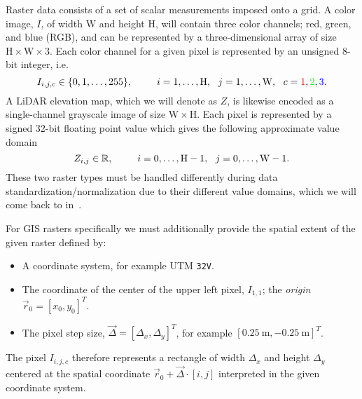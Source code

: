 Raster data consists of a set of scalar measurements imposed onto a grid.
A color image, $I$, of width $\mathrm{W}$ and height $\mathrm{H}$, will contain three color channels; red, green, and blue (RGB), and can be represented by a three-dimensional array of size $\mathrm{H} \times \mathrm{W} \times \mathrm{3}$.
Each color channel for a given pixel is represented by an unsigned 8-bit integer, i.e.
%
\begin{equation*}
  I_{i, j, c} \in \{0, 1, \ldots, 255\},
  \hspace{2.5em}
  i = 1, \ldots, \mathrm{H} ,
  ~~
  j = 1, \ldots, \mathrm{W},
  ~~
  c = \mathrm{\textcolor{red}{1}, \textcolor{green}{2}, \textcolor{blue}{3}}.
\end{equation*}
%
A LiDAR elevation map, which we will denote as $Z$, is likewise encoded as a single-channel grayscale image of size $\mathrm{W} \times \mathrm{H}$.
Each pixel is represented by a signed 32-bit floating point value which gives the following approximate value domain
%
\begin{equation*}
  Z_{i, j} \in \mathbb{R},
  \hspace{2.5em}
  i = 0, \ldots, \mathrm{H} - 1,
  ~~
  j = 0, \ldots, \mathrm{W} - 1.
\end{equation*}
%
These two raster types must be handled differently during data standardization/normalization due to their different value domains, which we will come back to in~.

\begin{minipage}{\textwidth}
  For GIS rasters specifically we must additionally provide the spatial extent of the given raster defined by:
  \begin{itemize}[noitemsep]
    \item A coordinate system, for example UTM \texttt{32V}.
    \item The coordinate of the center of the upper left pixel, $I_{1, 1}$; the \textit{origin} $\vec{r}_0 = {[x_0, y_0]}^T$.
    \item The pixel step size, $\vec{\Delta} = {[\Delta_x, \Delta_y]}^T$, for example ${[\SI{0.25}{\meter}, \SI{-0.25}{\meter}]}^T$.
  \end{itemize}
\end{minipage}
\vspace{0.5em}

The pixel $I_{i, j, c}$ therefore represents a rectangle of width $\Delta_x$ and height $\Delta_y$ centered at the spatial coordinate $\vec{r}_0 + \vec{\Delta} \cdot [i, j]$ interpreted in the given coordinate system.

